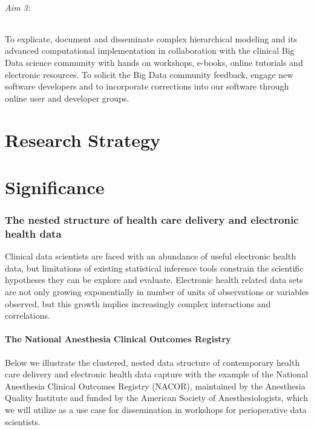 \documentclass[11pt,notitlepage]{article}
\begin{document}
\paragraph*{Aim 3:} To explicate, document and disseminate complex hierarchical modeling and its advanced computational implementation in collaboration with the clinical Big Data science community with hands on workshops, e-books, online tutorials and electronic resources. To solicit the Big Data community feedback, engage new software developers and to incorporate corrections into our software through online user and developer groups.

\part*{Research Strategy}

\part*{Significance}

\section*{The nested structure of health care delivery and electronic health data}
Clinical data scientists are faced with an abundance of useful electronic health data, but limitations of existing statistical inference tools constrain the scientific hypotheses they can be explore and evaluate. Electronic health related data sets are not only growing exponentially in number of units of observations or variables observed, but this growth implies increasingly complex interactions and correlations.  

\subsection*{The National Anesthesia Clinical Outcomes Registry}
Below we illustrate the clustered, nested data structure of contemporary health care delivery and electronic health data capture with the example of the National Anesthesia Clinical Outcomes Registry (NACOR), maintained by the Anesthesia Quality Institute and funded by the American Society of Anesthesiologists, which we will utilize as a use case for dissemination in workshops for perioperative data scientists.
\end{document}
